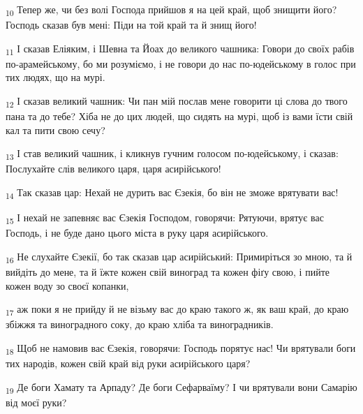 \begin{tcolorbox}
\textsubscript{10} Тепер же, чи без волі Господа прийшов я на цей край, щоб знищити його? Господь сказав був мені: Піди на той край та й знищ його!
\end{tcolorbox}
\begin{tcolorbox}
\textsubscript{11} І сказав Еліяким, і Шевна та Йоах до великого чашника: Говори до своїх рабів по-арамейському, бо ми розуміємо, і не говори до нас по-юдейському в голос при тих людях, що на мурі.
\end{tcolorbox}
\begin{tcolorbox}
\textsubscript{12} І сказав великий чашник: Чи пан мій послав мене говорити ці слова до твого пана та до тебе? Хіба не до цих людей, що сидять на мурі, щоб із вами їсти свій кал та пити свою сечу?
\end{tcolorbox}
\begin{tcolorbox}
\textsubscript{13} І став великий чашник, і кликнув гучним голосом по-юдейському, і сказав: Послухайте слів великого царя, царя асирійського!
\end{tcolorbox}
\begin{tcolorbox}
\textsubscript{14} Так сказав цар: Нехай не дурить вас Єзекія, бо він не зможе врятувати вас!
\end{tcolorbox}
\begin{tcolorbox}
\textsubscript{15} І нехай не запевняє вас Єзекія Господом, говорячи: Рятуючи, врятує вас Господь, і не буде дано цього міста в руку царя асирійського.
\end{tcolorbox}
\begin{tcolorbox}
\textsubscript{16} Не слухайте Єзекії, бо так сказав цар асирійський: Примиріться зо мною, та й вийдіть до мене, та й їжте кожен свій виноград та кожен фіґу свою, і пийте кожен воду зо своєї копанки,
\end{tcolorbox}
\begin{tcolorbox}
\textsubscript{17} аж поки я не прийду й не візьму вас до краю такого ж, як ваш край, до краю збіжжя та виноградного соку, до краю хліба та виноградників.
\end{tcolorbox}
\begin{tcolorbox}
\textsubscript{18} Щоб не намовив вас Єзекія, говорячи: Господь порятує нас! Чи врятували боги тих народів, кожен свій край від руки асирійського царя?
\end{tcolorbox}
\begin{tcolorbox}
\textsubscript{19} Де боги Хамату та Арпаду? Де боги Сефарваїму? І чи врятували вони Самарію від моєї руки?
\end{tcolorbox}
